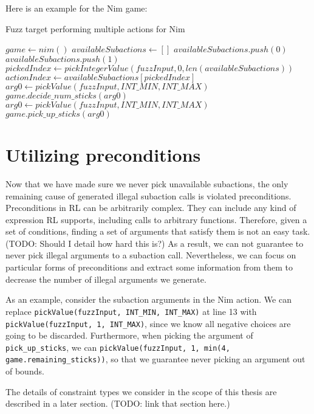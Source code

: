 Here is an example for the Nim game:
\begin{algorithm}[H]
    \caption{Fuzz target performing multiple actions for Nim}
    \begin{algorithmic}[1]
    \STATE $game \gets nim()$
        \STATE $availableSubactions \gets []$
            \STATE $availableSubactions.push(0)$
        \ENDIF
            \STATE $availableSubactions.push(1)$
        \ENDIF
        \STATE $pickedIndex \gets pickIntegerValue(fuzzInput, 0, len(availableSubactions))$
        \STATE $actionIndex \gets availableSubactions[pickedIndex]$
            \STATE $arg0 \gets pickValue(fuzzInput, INT\_MIN, INT\_MAX)$
                \STATE $game.decide\_num\_sticks(arg0)$
            \ENDIF
        \ENDIF
            \STATE $arg0 \gets pickValue(fuzzInput, INT\_MIN, INT\_MAX)$
                \STATE $game.pick\_up\_sticks(arg0)$
            \ENDIF
        \ENDIF
    \ENDWHILE
    \end{algorithmic}
\end{algorithm}

\section{Utilizing preconditions}
Now that we have made sure we never pick unavailable subactions, the only remaining cause of generated illegal subaction calls is violated preconditions.
Preconditions in RL can be arbitrarily complex. They can include any kind of expression RL supports, including calls to arbitrary functions.
Therefore, given a set of conditions, finding a set of arguments that satisfy them is not an easy task. (TODO: Should I detail how hard this is?)
As a result, we can not guarantee to never pick illegal arguments to a subaction call.
Nevertheless, we can focus on particular forms of preconditions and extract some information from them to decrease the number of illegal arguments we generate.

As an example, consider the subaction arguments in the Nim action.
We can replace \texttt{pickValue(fuzzInput, INT\_MIN, INT\_MAX)} at line 13 with \texttt{pickValue(fuzzInput, 1, INT\_MAX)}, since we know all negative choices are going to be discarded.
Furthermore, when picking the argument of \texttt{pick\_up\_sticks}, we can \texttt{pickValue(fuzzInput, 1, min(4, game.remaining\_sticks))}, so that we guarantee never picking an argument out of bounds.

The details of constraint types we consider in the scope of this thesis are described in a later section. (TODO: link that section here.)